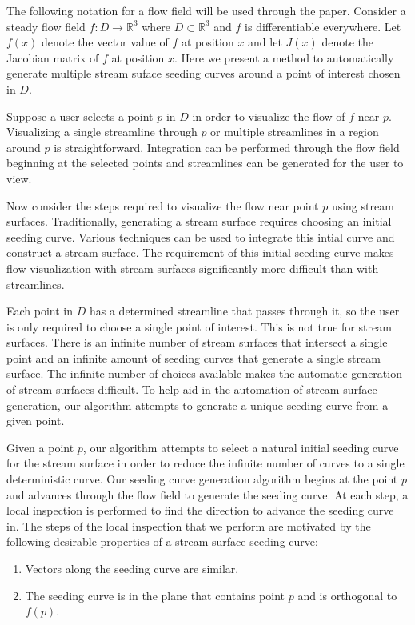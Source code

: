 \documentclass{vgtc}                          %
\newcommand {\emath}[1]  {\ensuremath{#1}}
\newcommand {\Real}[1]   {\emath{\mathbb{R}^{#1}}}   %
\begin{document}
The following notation for a flow field will be used through the paper.
Consider a steady flow field $f:D\rightarrow\Real3$ where $D\subset\Real3$ and $f$ is differentiable everywhere.
Let $f(x)$ denote the vector value of $f$ at position $x$ and let $J(x)$ denote the Jacobian matrix of $f$ at position $x$.
Here we present a method to automatically generate multiple stream suface seeding curves around a point of interest chosen in $D$.

Suppose a user selects a point $p$ in $D$ in order to visualize the flow of $f$ near $p$.
Visualizing a single streamline through $p$ or multiple streamlines in a region around $p$ is straightforward.
Integration can be performed through the flow field beginning at the selected points and streamlines can be generated for the user to view.

Now consider the steps required to visualize the flow near point $p$ using stream surfaces.
Traditionally, generating a stream surface requires choosing an initial seeding curve.
Various techniques can be used to integrate this intial curve and construct a stream surface. 
The requirement of this initial seeding curve makes flow visualization with stream surfaces significantly more difficult than with streamlines.

Each point in $D$ has a determined streamline that passes through it, so the user is only required to choose a single point of interest.
This is not true for stream surfaces.
There is an infinite number of stream surfaces that intersect a single point and an infinite amount of seeding curves that generate a single stream surface.
The infinite number of choices available makes the automatic generation of stream surfaces difficult.
To help aid in the automation of stream surface generation, our algorithm attempts to generate a unique seeding curve from a given point.

Given a point $p$, our algorithm attempts to select a natural initial seeding curve for the stream surface in order to reduce the infinite number of curves to a single deterministic curve.
Our seeding curve generation algorithm begins at the point $p$ and advances through the flow field to generate the seeding curve.
At each step, a local inspection is performed to find the direction to advance the seeding curve in.
The steps of the local inspection that we perform are motivated by the following desirable properties of a stream surface seeding curve:
\begin{enumerate}
\item Vectors along the seeding curve are similar.
\item The seeding curve is in the plane that contains point $p$ and is orthogonal to $f(p)$.
\end{enumerate}
\end{document}
